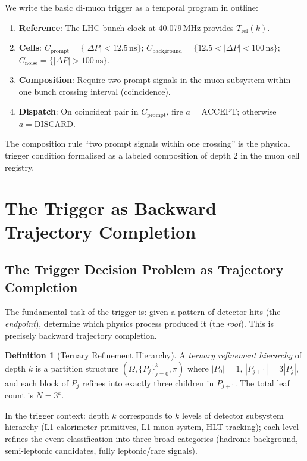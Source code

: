 \documentclass[twocolumn,10pt,a4paper]{article}
\theoremstyle{thmstyle}
\theoremstyle{definition}
\newtheorem{definition}[theorem]{Definition}
\theoremstyle{remark}
\newcommand{\dP}{\Delta P}
\begin{document}
We write the basic di-muon trigger as a temporal program in outline:

\begin{enumerate}[leftmargin=1.5em,itemsep=0.2em]
\item \textbf{Reference}: The LHC bunch clock at 40.079\,MHz provides
$T_{\mathrm{ref}}(k)$.
\item \textbf{Cells}: $C_{\mathrm{prompt}} = \{|\dP| < 12.5\,\mathrm{ns}\}$;
$C_{\mathrm{background}} = \{12.5 < |\dP| < 100\,\mathrm{ns}\}$;
$C_{\mathrm{noise}} = \{|\dP| > 100\,\mathrm{ns}\}$.
\item \textbf{Composition}: Require two prompt signals in the muon
subsystem within one bunch crossing interval (coincidence).
\item \textbf{Dispatch}: On coincident pair in $C_{\mathrm{prompt}}$,
fire $a = \mathrm{ACCEPT}$; otherwise $a = \mathrm{DISCARD}$.
\end{enumerate}

The composition rule ``two prompt signals within one crossing'' is the
physical trigger condition formalised as a labeled composition of
depth 2 in the muon cell registry.

\section{The Trigger as Backward Trajectory Completion}
\label{sec:backward}

\subsection{The Trigger Decision Problem as Trajectory Completion}

The fundamental task of the trigger is: given a pattern of detector
hits (the \emph{endpoint}), determine which physics process produced
it (the \emph{root}). This is precisely backward trajectory completion.

\begin{definition}[Ternary Refinement Hierarchy]
A \emph{ternary refinement hierarchy} of depth $k$ is a partition
structure $(\Omega, \{P_j\}_{j=0}^k, \pi)$ where $|P_0| = 1$,
$|P_{j+1}| = 3|P_j|$, and each block of $P_j$ refines into exactly
three children in $P_{j+1}$. The total leaf count is $N = 3^k$.
\end{definition}

In the trigger context: depth $k$ corresponds to $k$ levels of
detector subsystem hierarchy (L1 calorimeter primitives, L1 muon
system, HLT tracking); each level refines the event classification
into three broad categories (hadronic background, semi-leptonic
candidates, fully leptonic/rare signals).
\end{document}
